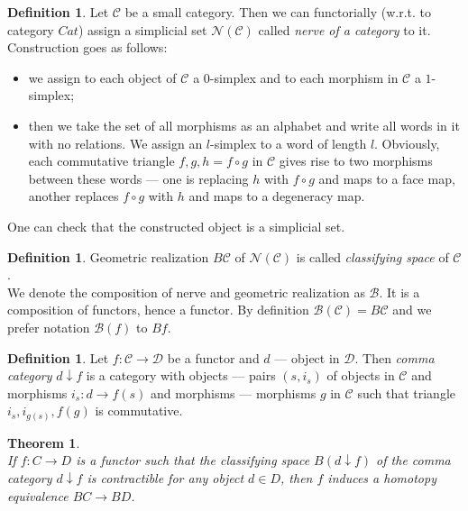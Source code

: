 \documentclass[english,12pt]{article}
\newcounter{stmcounter}[section]
\newcounter{thcounter}
\numberwithin{equation}{section}
\newtheorem{theorem}[thcounter]{Theorem}
\theoremstyle{definition}
\newtheorem{definition}[stmcounter]{Definition}
\theoremstyle{remark}
\newcommand{\define}[1]{{\textit{#1}}}
\begin{document}
\begin{definition}
  Let $\mathcal{C}$ be a small category. Then we can functorially (w.r.t. to category $Cat$) assign a simplicial set $\mathcal{N}(\mathcal{C})$ called \define{nerve of a category} to it.\\

  Construction goes as follows:
  \begin{itemize}
    \item we assign to each object of $\mathcal{C}$ a $0$-simplex and to each morphism in $\mathcal{C}$ a $1$-simplex;
    \item then we take the set of all morphisms as an alphabet and write all words in it with no relations. We assign an $l$-simplex to a word of length $l$. Obviously, each commutative triangle $f, g, h = f \circ g$ in $\mathcal{C}$ gives rise to two morphisms between these words --- one is replacing $h$ with $f \circ g$ and maps to a face map, another replaces $f \circ g$ with $h$ and maps to a degeneracy map.
  \end{itemize}

   One can check that the constructed object is a simplicial set.
\end{definition}

\begin{definition}
  Geometric realization $B\mathcal{C}$ of $\mathcal{N}(\mathcal{C})$ is called \define{classifying space} of $\mathcal{C}$.\\

  We denote the composition of nerve and geometric realization as $\mathcal{B}$. It is a composition of functors, hence a functor. By definition $\mathcal{B}(\mathcal{C}) = B\mathcal{C}$ and we prefer notation $\mathcal{B}(f)$ to $Bf$.
\end{definition}

\begin{definition}
  Let $f: \mathcal{C} \to \mathcal{D}$ be a functor and $d$ --- object in $\mathcal{D}$. Then \define{comma category} $d \downarrow f$ is a category with objects --- pairs $(s,i_s)$ of objects in $\mathcal{C}$ and morphisms $i_s : d \to f(s)$ and morphisms --- morphisms $g$ in $\mathcal{C}$ such that triangle $i_s, i_{g(s)}, f(g)$ is commutative.
\end{definition}

\begin{theorem} {\cite[Theorem A]{Quillen72}}\\
  If $f: C \to D$ is a functor such that the classifying space $B(d \downarrow f)$ of the comma category $d \downarrow f$ is contractible for any object $d \in D$, then $f$ induces a homotopy equivalence $BC \to BD$.
\end{theorem}
\end{document}
